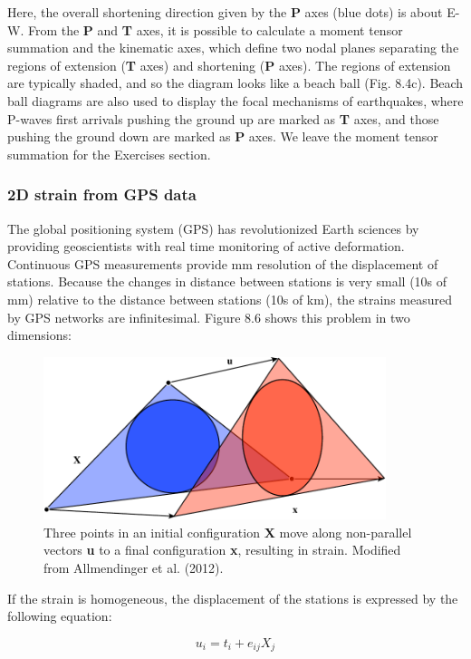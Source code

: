\documentclass[a4paper , 12pt]{book}
\begin{document}
Here, the overall shortening direction given by the \textbf{P} axes (blue dots) is about E-W. From the \textbf{P} and \textbf{T} axes, it is possible to calculate a moment tensor summation and the kinematic axes, which define two nodal planes separating the regions of extension (\textbf{T} axes) and shortening (\textbf{P} axes). The regions of extension are typically shaded, and so the diagram looks like a beach ball (Fig. 8.4c). Beach ball diagrams are also used to display the focal mechanisms of earthquakes, where P-waves first arrivals pushing the ground up are marked as \textbf{T} axes, and those pushing the ground down are marked as \textbf{P} axes. We leave the moment tensor summation for the Exercises section.

\subsubsection{2D strain from GPS data}

The global positioning system (GPS) has revolutionized Earth sciences by providing geoscientists with real time monitoring of active deformation. Continuous GPS measurements provide mm resolution of the displacement of stations. Because the changes in distance between stations is very small (10s of mm) relative to the distance between stations (10s of km), the strains measured by GPS networks are infinitesimal. Figure 8.6 shows this problem in two dimensions:

\begin{figure}[ht]
    \centering
    \includegraphics[width=10.0cm]{ch8f7.pdf}
    \caption{Three points in an initial configuration \textbf{X} move along non-parallel vectors \textbf{u} to a final configuration \textbf{x}, resulting in strain. Modified from Allmendinger et al. (2012).}
\end{figure}

If the strain is homogeneous, the displacement of the stations is expressed by the following equation:

\begin{equation}
    u_{i}=t_{i}+e_{i j} X_{j}
\end{equation}
\end{document}
